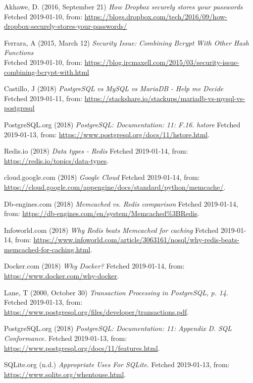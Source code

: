 \documentclass[12pt,a4paper]{report}
\begin{document}
{\begin{thebibliography}{1}
Akhawe, D. (2016, September 21) {\em How Dropbox securely stores your passwords} \\
Fetched 2019-01-10, from:
\url{https://blogs.dropbox.com/tech/2016/09/how-dropbox-securely-stores-your-passwords/}

Ferrara, A (2015, March 12) {\em Security Issue: Combining Bcrypt With Other Hash Functions} \\
Fetched 2019-01-10, from:
\url{https://blog.ircmaxell.com/2015/03/security-issue-combining-bcrypt-with.html}

Castillo, J (2018) {\em PostgreSQL vs MySQL vs MariaDB - Help me Decide} \\
Fetched 2019-01-11, from:
\url{https://stackshare.io/stackups/mariadb-vs-mysql-vs-postgresql}

PostgreSQL.org (2018) {\em PostgreSQL: Documentation: 11: F.16. hstore} Fetched 2019-01-13, from: \url{https://www.postgresql.org/docs/11/hstore.html}.

Redis.io (2018) {\em Data types - Redis} Fetched 2019-01-14, from: \url{https://redis.io/topics/data-types}.

cloud.google.com (2018) {\em Google Cloud} Fetched 2019-01-14, from: \url{https://cloud.google.com/appengine/docs/standard/python/memcache/}.

Db-engines.com (2018) {\em Memcached vs. Redis comparison} Fetched 2019-01-14, from: \url{https://db-engines.com/en/system/Memcached%3BRedis}.

Infoworld.com (2018) {\em Why Redis beats Memcached for caching} Fetched 2019-01-14, from: \url{https://www.infoworld.com/article/3063161/nosql/why-redis-beats-memcached-for-caching.html}.

Docker.com (2018) {\em Why Docker?} Fetched 2019-01-14, from: \url{https://www.docker.com/why-docker}.

Lane, T (2000, October 30) {\em Transaction Processing in PostgreSQL, p. 14.} Fetched 2019-01-13, from: \url{https://www.postgresql.org/files/developer/transactions.pdf}.

PostgreSQL.org (2018) {\em PostgreSQL: Documentation: 11: Appendix D. SQL Conformance.} Fetched 2019-01-13, from: \url{https://www.postgresql.org/docs/11/features.html}.

SQLite.org (n.d.) {\em Appropriate Uses For SQLite.} Fetched 2019-01-13, from: \url{https://www.sqlite.org/whentouse.html}.


\end{thebibliography}}
\end{document}
